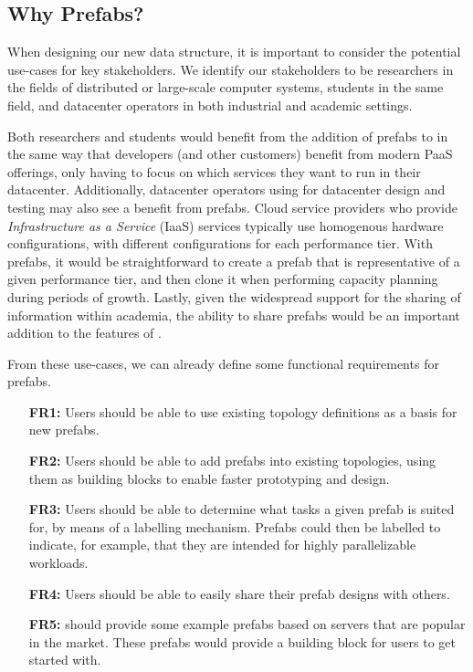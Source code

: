 \documentclass[11pt]{article}
\begin{document}
	\subsection{Why Prefabs?}
		When designing our new data structure, it is important to consider the potential use-cases for key stakeholders.
		We identify our stakeholders to be researchers in the fields of distributed or large-scale computer systems, students in the same field, and datacenter operators in both industrial and academic settings.

		Both researchers and students would benefit from the addition of prefabs to \opendc{} in the same way that developers (and other customers) benefit from modern PaaS offerings, only having to focus on which services they want to run in their datacenter.
		Additionally, datacenter operators using \opendc{} for datacenter design and testing may also see a benefit from prefabs. 
		Cloud service providers who provide \textit{Infrastructure as a Service} (IaaS) services typically use homogenous hardware configurations, with different configurations for each performance tier. 
		With prefabs, it would be straightforward to create a prefab that is representative of a given performance tier, and then clone it when performing capacity planning during periods of growth.
		Lastly, given the widespread support for the sharing of information within academia, the ability to share prefabs would be an important addition to the features of \opendc{}.

		From these use-cases, we can already define some functional requirements for prefabs.
		\begin{itemize}
			\item [\textbf{FR1:}] Users should be able to use existing topology definitions as a basis for new prefabs.
			\item [\textbf{FR2:}] Users should be able to add prefabs into existing topologies, using them as building blocks to enable faster prototyping and design.
			\item [\textbf{FR3:}] Users should be able to determine what tasks a given prefab is suited for, by means of a labelling mechanism. Prefabs could then be labelled to indicate, for example, that they are intended for highly parallelizable workloads.
			\item [\textbf{FR4:}] Users should be able to easily share their prefab designs with others.
			\item [\textbf{FR5:}] \opendc{} should provide some example prefabs based on servers that are popular in the market. These prefabs would provide a building block for users to get started with.
		\end{itemize}
\end{document}

